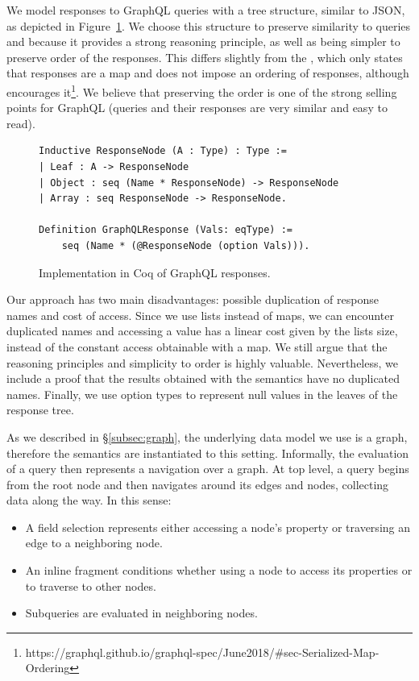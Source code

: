 We model responses to GraphQL queries with a tree structure, similar to JSON, as depicted in Figure~\ref{fig:responses}. We choose this structure to preserve similarity to queries and because it provides a strong reasoning principle, as well as being simpler to preserve order of the responses. This differs slightly from the \spec{}, which only states that responses are a map and does not impose an ordering of responses, although encourages it\footnote{https://graphql.github.io/graphql-spec/June2018/\#sec-Serialized-Map-Ordering}. We believe that preserving the order is one of the strong selling points for GraphQL (queries and their responses are very similar and easy to read). 

\begin{figure}[h]
\begin{verbatim}
Inductive ResponseNode (A : Type) : Type :=
| Leaf : A -> ResponseNode
| Object : seq (Name * ResponseNode) -> ResponseNode
| Array : seq ResponseNode -> ResponseNode.

Definition GraphQLResponse (Vals: eqType) :=
    seq (Name * (@ResponseNode (option Vals))).
\end{verbatim}
\caption{Implementation in Coq of GraphQL responses.}
\label{fig:responses}
\end{figure}

 Our approach has two main disadvantages: possible duplication of response names and cost of access. Since we use lists instead of maps, we can encounter duplicated names and accessing a value has a linear cost given by the lists size, instead of the constant access obtainable with a map. We still argue that the reasoning principles and simplicity to order is highly valuable. Nevertheless, we include a proof that the results obtained with the semantics have no duplicated names. Finally, we use option types to represent null values in the leaves of the response tree.



As we described in \S\ref{subsec:graph}, the underlying data model we use is a graph, therefore the semantics are instantiated to this setting. %
Informally, the evaluation of a query then represents a navigation over a graph. At top level, a query begins from the root node and then navigates around its edges and nodes, collecting data along the way. In this sense:
\begin{itemize}
    \item A field selection represents either accessing a node's property or traversing an edge to a neighboring node.
    \item An inline fragment conditions whether using a node to access its properties or to traverse to other nodes.
    \item Subqueries are evaluated in neighboring nodes.
\end{itemize}

